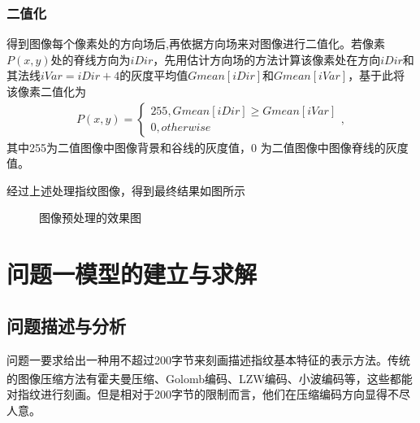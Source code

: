 \documentclass{whutmod}
\newcommand{\upcite}[1]{\textsuperscript{\cite{#1}}}
\begin{document}
\begin{itemize}
\subsubsection{二值化}
得到图像每个像素处的方向场后,再依据方向场来对图像进行二值化。若像素$P(x,y)$处的脊线方向为$iDir$，先用估计方向场的方法计算该像素处在方向$iDir$和其法线$iVar=iDir+4$的灰度平均值$ Gmean[iDir]$和$ Gmean[iVar]$，基于此将该像素二值化为
\begin{gather*}
	P(x,y)=\left\{\begin{matrix}255, Gmean[iDir]\geqslant Gmean[iVar]
		\\ 0,otherwise
	\end{matrix}\right. ,
\end{gather*}
其中255为二值图像中图像背景和谷线的灰度值，0 为二值图像中图像脊线的灰度值。

	经过上述处理指纹图像，得到最终结果如图所示
	       	\begin{figure}[H]	
		\centering
		\caption{图像预处理的效果图}
		\label{zhiwesn}
	\end{figure}
	
	
	\section{问题一模型的建立与求解}
	
		\subsection{问题描述与分析}
			问题一要求给出一种用不超过200字节来刻画描述指纹基本特征的表示方法。传统的图像压缩方法有霍夫曼压缩、Golomb编码、LZW编码、小波编码等\upcite{7,8,9}，这些都能对指纹进行刻画。但是相对于200字节的限制而言，他们在压缩编码方向显得不尽人意。
			

\end{itemize}
\end{document}
